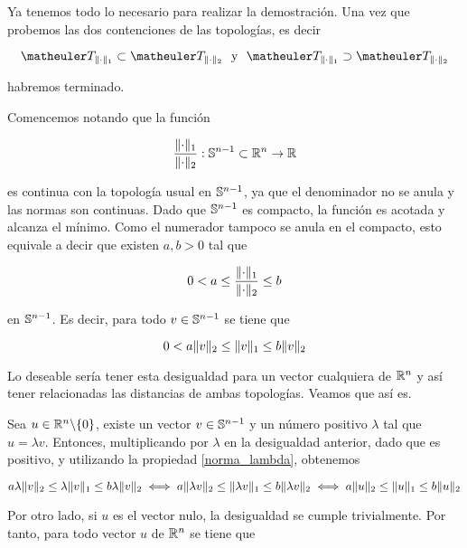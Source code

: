 Ya tenemos todo lo necesario para realizar la demostración. Una vez que probemos las dos contenciones de las topologías, es decir

\begin{equation*}
\T_{\norm{\cdot}_1}\subset\T_{\norm{\cdot}_2} \ \ \text{y} \  \	\T_{\norm{\cdot}_1}\supset\T_{\norm{\cdot}_2}
\end{equation*}

habremos terminado. 


Comencemos notando que la función 

\begin{equation*}
\frac{\lVert\cdot\rVert_1}{\lVert\cdot\rVert_2}:\mathbb{S}^{n-1}\subset \mathbb{R}^n\rightarrow \mathbb{R}
\end{equation*}

es continua con la topología usual en $\mathbb{S}^{n-1}$, ya que el denominador no se anula y las normas son continuas. Dado que $\mathbb{S}^{n-1}$ es compacto, la función es acotada y alcanza el mínimo. Como el numerador tampoco se anula en el compacto, esto equivale a decir que existen $a,b>0$ tal que

\begin{equation*}
0<a\le \frac{\lVert\cdot\rVert_1}{\lVert\cdot\rVert_2}\le b
\end{equation*}

en $\mathbb{S}^{n-1}$. Es decir, para todo $v\in\mathbb{S}^{n-1}$ se tiene que

\begin{equation*}
0<a\lVert v\rVert_2\le \lVert v\rVert_1\le b\lVert v\rVert_2
\end{equation*}

Lo deseable sería tener esta desigualdad para un vector cualquiera de $\mathbb{R}^n$ y así tener relacionadas las distancias de ambas topologías. Veamos que así es.


Sea $u\in\mathbb{R}^n\backslash\{0\}$, existe un vector $v\in \mathbb{S}^{n-1}$ y un número positivo $\lambda$ tal que $u=\lambda v$. Entonces, multiplicando por $\lambda$ en la desigualdad anterior, dado que es positivo, y utilizando la propiedad \ref{norma_lambda}, obtenemos

\begin{equation*}
a\lambda\lVert v\rVert_2\le \lambda\lVert v\rVert_1\le b\lambda\lVert v\rVert_2\iff a\lVert\lambda v\rVert_2\le \lVert\lambda v\rVert_1\le b\lVert\lambda v\rVert_2\iff a\lVert u\rVert_2\le \lVert u\rVert_1\le b\lVert u\rVert_2
\end{equation*}

Por otro lado, si $u$ es el vector nulo, la desigualdad se cumple trivialmente. Por tanto, para todo vector $u$ de $\mathbb{R}^n$ se tiene que

